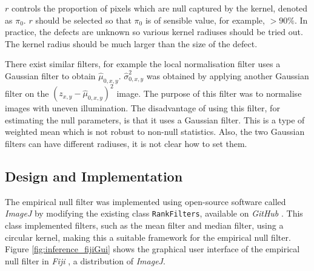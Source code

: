 $r$ controls the proportion of pixels which are null captured by the kernel, denoted as $\pi_0$. $r$ should be selected so that $\pi_0$ is of sensible value, for example, $>90\%$. In practice, the defects are unknown so various kernel radiuses should be tried out. The kernel radius should be much larger than the size of the defect.

There exist similar filters, for example the local normalisation filter \citep{sage2003teaching, sage2018local} uses a Gaussian filter to obtain $\widehat{\mu}_{0,x,y}$. $\widehat{\sigma}_{0,x,y}^2$ was obtained by applying another Gaussian filter on the $\left(z_{x,y}-\widehat{\mu}_{0,x,y}\right)^2$ image. The purpose of this filter was to normalise images with uneven illumination. The disadvantage of using this filter, for estimating the null parameters, is that it uses a Gaussian filter. This is a type of weighted mean which is not robust to non-null statistics. Also, the two Gaussian filters can have different radiuses, it is not clear how to set them.

\subsection{Design and Implementation}

The empirical null filter was implemented using open-source software called \emph{ImageJ} \citep{abramoff2004image, schneider2012nih, perez2013image} by modifying the existing class \texttt{RankFilters}, available on \emph{GitHub} \citep{imagej2018rank}. This class implemented filters, such as the mean filter and median filter, using a circular kernel, making this a suitable framework for the empirical null filter. Figure \ref{fig:inference_fijiGui} shows the graphical user interface of the empirical null filter in \emph{Fiji} \citep{schindelin2012fiji}, a distribution of \emph{ImageJ}.

